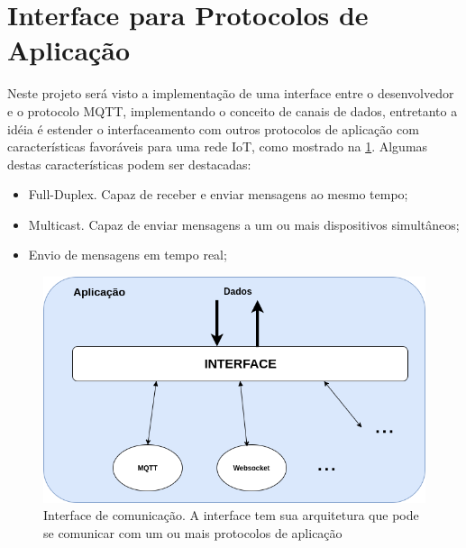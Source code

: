 \section{Interface para Protocolos de Aplicação}
\label{section:interface_iot}

Neste projeto será visto a implementação de uma interface entre o desenvolvedor e  o protocolo MQTT, implementando o conceito de canais de dados, entretanto a idéia é estender o interfaceamento com outros protocolos de aplicação com características favoráveis para uma rede IoT, como mostrado na \ref{fig:2.2.0/camada_abatracao}.  Algumas destas características podem ser destacadas:

\begin{itemize}

\item Full-Duplex. Capaz de receber e enviar mensagens ao mesmo tempo;
\item Multicast. Capaz de enviar mensagens a um ou mais dispositivos simultâneos;
\item Envio de mensagens em tempo real;

\end{itemize}


\begin{figure}[h!]
\centering
\includegraphics[width=12cm]{./02_Capitulos/02_Cap2/figures/camada_abstracao}
\caption{Interface de comunicação. A interface tem sua arquitetura que pode se comunicar com um ou mais protocolos de aplicação}
\label{fig:2.2.0/camada_abatracao}
\end{figure}

